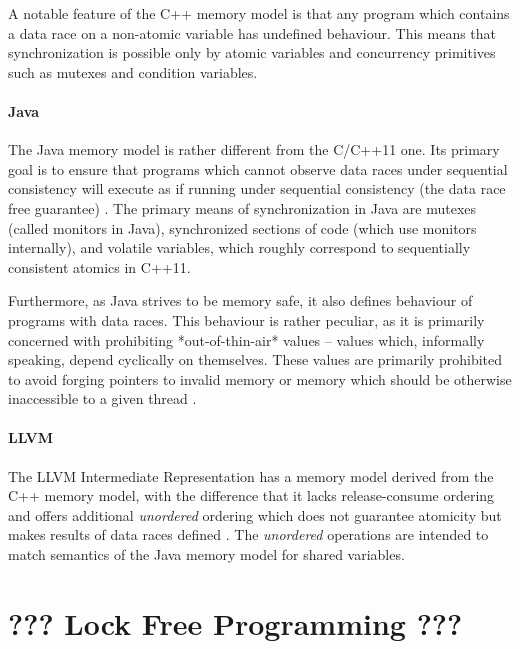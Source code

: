 A notable feature of the C++ memory model is that any program which contains a
data race on a non-atomic variable has undefined
behaviour.
This means that synchronization is possible only by atomic variables and
concurrency primitives such as mutexes and condition variables.

\paragraph{Java}
%
The Java memory model is rather different from the C/C++11 one.
Its primary goal is to ensure that programs which cannot observe data races under sequential consistency will execute as if running under sequential consistency (the data race free guarantee) \cite{javamm_popl_Manson2005}.
The primary means of synchronization in Java are mutexes (called monitors in Java), synchronized sections of code (which use monitors internally), and volatile variables, which roughly correspond to sequentially consistent atomics in C++11.

Furthermore, as Java strives to be memory safe, it also defines behaviour of programs with data races.
This behaviour is rather peculiar, as it is primarily concerned with prohibiting *out-of-thin-air* values -- values which, informally speaking, depend cyclically on themselves.
These values are primarily prohibited to avoid forging pointers to invalid memory or memory which should be otherwise inaccessible to a given thread \cite{javamm_popl_Manson2005}.

\paragraph{LLVM}
%
The LLVM Intermediate Representation has a memory model derived from the C++
memory model, with the difference that it lacks release-consume ordering and
offers additional \emph{unordered} ordering which does not guarantee atomicity
but makes results of data races defined .
The \emph{unordered} operations are intended to match semantics of the Java
memory model for shared variables.

\section{??? Lock Free Programming ???}

